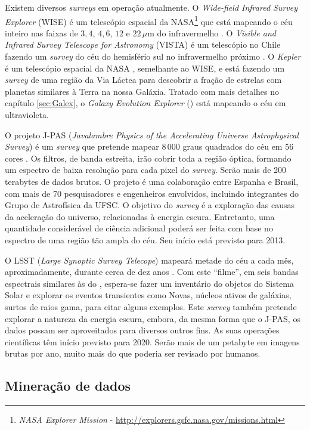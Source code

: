 Existem diversos {\em surveys} em operação atualmente. O {\em Wide-field
Infrared Survey Explorer} (WISE) é um telescópio espacial da NASA\footnote{{\em
NASA Explorer Mission} - \url{http://explorers.gsfc.nasa.gov/missions.html}} que
está mapeando o céu inteiro nas faixas de $3,4$, $4,6$, $12$ e
$22\,\mu\mathrm{m}$ do infravermelho \citep{Wright2010}. O {\em Visible and
Infrared Survey Telescope for Astronomy} (VISTA) é um telescópio no Chile
fazendo um {\em survey} do céu do hemisfério sul no infravermelho próximo
\citep{Born2010}. O {\em Kepler} é um telescópio espacial da NASA
\citep{Borucki2010}, semelhante ao WISE, e está fazendo um {\em survey} de uma
região da Via Láctea para descobrir a fração de estrelas com planetas similares
à Terra na nossa Galáxia. Tratado com mais detalhes no capítulo \ref{sec:Galex},
o {\em Galaxy Evolution Explorer} (\galex) está mapeando o céu em ultravioleta.

O projeto J-PAS ({\em Javalambre Physics of the Accelerating Universe
Astrophysical Survey}) é um {\em survey} que pretende mapear $8\,000$ graus
quadrados do céu em 56 cores \citep{Benitez2009}. Os filtros, de banda estreita,
irão cobrir toda a região óptica, formando um espectro de baixa resolução para
cada pixel do {\em survey}. Serão mais de 200 terabytes de dados brutos. O
projeto é uma colaboração entre Espanha e Brasil, com mais de 70 pesquisadores e
engenheiros envolvidos, incluindo integrantes do Grupo de Astrofísica da UFSC. O
objetivo do {\em survey} é a exploração das causas da aceleração do universo,
relacionadas à energia escura. Entretanto, uma quantidade considerável de
ciência adicional poderá ser feita com base no espectro de uma região tão ampla
do céu. Seu início está previsto para 2013.

O LSST ({\em Large Synoptic Survey Telecope}) mapeará metade do céu a cada mês,
aproximadamente, durante cerca de dez anos \citep{Ivezic2008}. Com este
``filme'', em seis bandas espectrais similares às do \SDSS, espera-se fazer um
inventário do objetos do Sistema Solar e explorar os eventos transientes como
Novas, núcleos ativos de galáxias, surtos de raios gama, para citar alguns
exemplos. Este {\em survey} também pretende explorar a natureza da energia
escura, embora, da mesma forma que o J-PAS, os dados possam ser aproveitados
para diversos outros fins. As suas operações científicas têm início previsto
para 2020. Serão mais de um petabyte em imagens brutas por ano, muito mais do
que poderia ser revisado por humanos.

\subsection{Mineração de dados}

